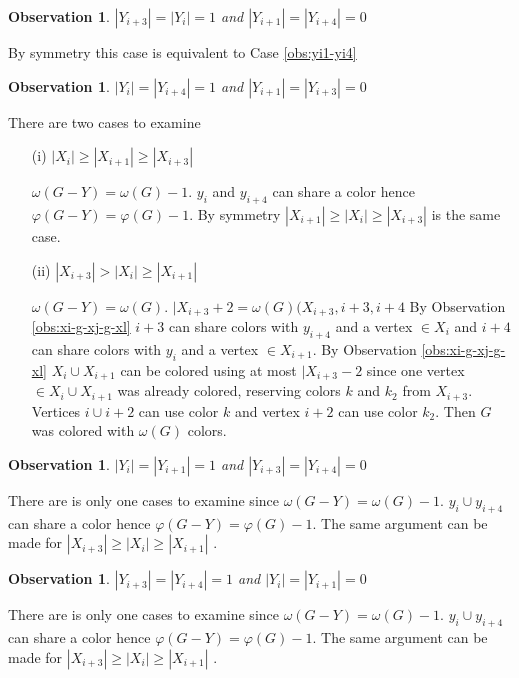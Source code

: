 \documentclass[12pt]{article}
\newtheorem{Observation}[Theorem]{Observation}
\begin{document}
\begin{Observation}\label{obs:yi3-yi} 
$|Y_{i+3}| = |Y_{i}| = 1$ and $|Y_{i+1}| = |Y_{i+4}| = 0$
\end{Observation}
 By symmetry this case is equivalent to Case \ref{obs:yi1-yi4}

\begin{Observation}\label{obs:yi-yi4}
$|Y_{i}| = |Y_{i+4}| = 1$ and $|Y_{i+1}| = |Y_{i+3}| = 0$
\end{Observation}
 There are two cases to examine
	\begin{itemize}
	\item[(i)]
	$|X_{i}| \geq  |X_{i+1}| \geq |X_{i+3}|$

	$\omega(G - Y) = \omega(G) - 1$. $y_i$ and $y_{i+4}$ can share a color hence $\varphi(G - Y) = \varphi(G) - 1$. By symmetry $|X_{i+1}| \geq  |X_{i}| \geq |X_{i+3}|$ is the same case.

	\item[(ii)]
	$|X_{i+3}| > |X_{i}| \geq |X_{i+1}|$

	$\omega(G - Y) = \omega(G)$. $|X_{i+3} +2 =\omega(G) (X_{i+3}, i+3, i+4$ By Observation \ref{obs:xi-g-xj-g-xl} $i+3$ can share colors with $y_{i+4}$ and a vertex $\in X_i$ and $i+4$ can share colors with $y_i$ and a vertex $\in X_{i+1}$. By Observation \ref{obs:xi-g-xj-g-xl} $X_i \cup X_{i+1}$ can be colored using at most $|X_{i+3} - 2$ since one vertex $\in X_i \cup X_{i+1}$ was already colored, reserving colors $k$ and $k_2$ from $X_{i+3}$. Vertices $i \cup i+2$ can use color $k$ and vertex $i+2$ can use color $k_2$. Then $G$ was colored with $\omega(G)$ colors.
	\end{itemize}

\begin{Observation}\label{obs:yi-yi4}
$|Y_{i}| = |Y_{i+1}| = 1$ and $|Y_{i+3}| = |Y_{i+4}| = 0$
\end{Observation}
 There are is only one cases to examine since $\omega(G - Y) = \omega(G) - 1 $. $y_{i} \cup y_{i+4}$ can share a color hence $\varphi(G - Y) = \varphi(G) - 1$. The same argument can be made for $|X_{i+3}| \geq |X_i| \geq |X_{i+1}|$ .

\begin{Observation}\label{obs:yi-yi4}
$|Y_{i+3}| = |Y_{i+4}| = 1$ and $|Y_{i}| = |Y_{i+1}| = 0$
\end{Observation}
 There are is only one cases to examine since $\omega(G - Y) = \omega(G) - 1 $. $y_{i} \cup y_{i+4}$ can share a color hence $\varphi(G - Y) = \varphi(G) - 1$. The same argument can be made for $|X_{i+3}| \geq |X_i| \geq |X_{i+1}|$ .
\end{document}
